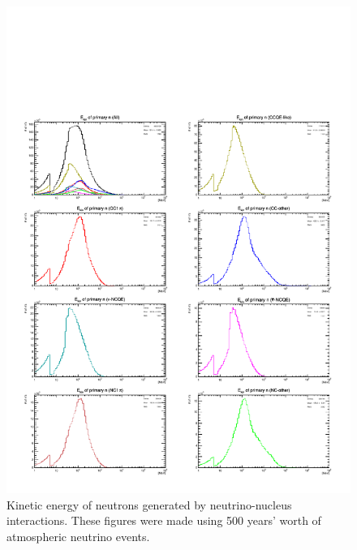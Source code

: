 \begin{figure}[h]
	\centering
	\includegraphics[width=16cm]{PDF/NEUT/s1_2_official/neutron/LogEnePri}
	\caption[Kinetic energy of neutrons generated by neutrino-nucleus interactions]{
	Kinetic energy of neutrons generated by neutrino-nucleus interactions.
	These figures were made using 500 years' worth of atmospheric neutrino events.
	}\label{neutronLogEnePri}
\end{figure}

